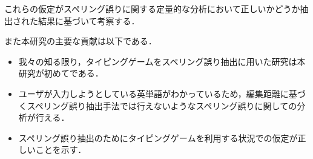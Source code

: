 これらの仮定がスペリング誤りに関する定量的な分析において正しいかどうか抽出された結果に基づいて考察する．

また本研究の主要な貢献は以下である．

\begin{itemize}
 \item 我々の知る限り，タイピングゲームをスペリング誤り抽出に用いた研究は本研究が初めてである．
 \item ユーザが入力しようとしている英単語がわかっているため，編集距離に基づくスペリング誤り抽出手法\cite{aramakiNLP2010}では行えないようなスペリング誤りに関しての分析が行える．
 \item スペリング誤り抽出のためにタイピングゲームを利用する状況での仮定が正しいことを示す．
\end{itemize}
